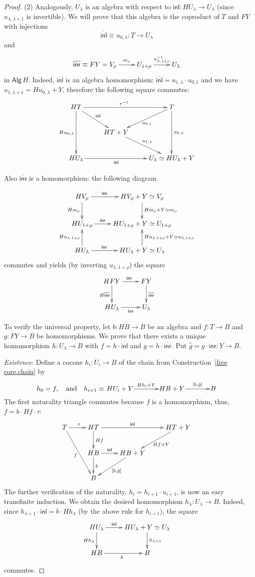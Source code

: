 \documentclass{LMCS}
\theoremstyle{plain}
\theoremstyle{definition}
\numberwithin{equation}{section}
\begin{document}
\begin{proof}
(2) Analogously, $U_\lambda$ is an algebra with respect to $\mathsf{inl}:HU_\lambda \rightarrow U_\lambda$ (since $u_{\lambda,\lambda+1}$ is invertible). We will prove that this algebra is the coproduct of $T$ and $FY$ with injections $$\overline{\mathsf{inl}}\equiv u_{0,\lambda}:T\rightarrow U_\lambda$$ and $$\xymatrix{\overline{\mathsf{inr}}\equiv FY=V_\rho\ar[r]^-{m_\rho}& U_{1+\rho}\ar[r]^-{u_{\lambda,{1+\rho}}^{-1}}& U_\lambda}$$
in $\mathsf{Alg}\, H$. Indeed, $\overline{\mathsf{inl}}$ is an algebra homomorphism: $\overline{\mathsf{inl}}=u_{1,\lambda}\cdot u_{0,1}$ and we have $u_{1,\lambda+1}=Hu_{0,\lambda}+Y$, therefore the following square commutes:
$$
\xymatrix{
HT\ar[rr]^{\tau^{-1}}\ar[rd]^-{\mathsf{inl}}\ar[dd]_{Hu_{0,\lambda}}&&T\ar[ld]^{u_{0,1}}\ar[dd]^{u_{0,\lambda}}\\
&HT+Y\ar[dr]^{u_{1,\lambda}}\\
HU_\lambda\ar[rr]_-{\mathsf{inl}}&&U_\lambda\simeq HU_\lambda+Y
}
$$

Also $\overline{\mathsf{inr}}$ is a homomorphism: the following diagram

$$
\xymatrix{
HV_\rho\ar[r]^-{\mathsf{inr}}\ar[d]_{Hm_\rho}&HV_\rho+Y\simeq V_\rho\ar[d]^{ Hm_\rho+Y\simeq m_\rho}\\
HU_{1+\rho}\ar[r]^-{\mathsf{inr}}&HU_{1+\rho}+Y\simeq U_{1+\rho}\\
HU_\lambda\ar[u]^{Hu_{\lambda,1+\rho}}\ar[r]^-{\mathsf{inr}}&HU_\lambda+Y\simeq U_\lambda\ar[u]_{Hu_{\lambda,1+\rho}+Y\simeq u_{\lambda,1+\rho}}
}
$$
commutes and yields (by inverting $u_{\lambda,1+\rho}$) the square
$$
\xymatrix{
HFY\ar[r]^{\mathsf{inr}}\ar[d]_{H\overline{\mathsf{inr}}}&FY\ar[d]^{\overline{\mathsf{inr}}}\\
HU_\lambda\ar[r]_-{\mathsf{inr}}&U_\lambda
}
$$

To verify the universal property, let $b:HB\rightarrow B$ be an algebra and $f:T\rightarrow B$ and $g:FY\rightarrow B$ be homomorphisms. We prove that there exists a unique homomorphism $h:U_\lambda\rightarrow B$ with $f=h\cdot\overline{\mathsf{inl}}$ and $g=h\cdot\overline{\mathsf{inr}}$. Put $\hat{g}=g\cdot\mathsf{inr}:Y\rightarrow B$.

{\it Existence}: Define a cocone $h_i:U_i\rightarrow B$ of the chain from
Construction~\ref{free core.chain} by
 $$h_0= f,\quad\text{and}\quad h_{i+1}\equiv \xymatrix@1@+1pc{HU_i+Y\ar[r]^-{Hh_i+Y}& HB+Y\ar[r]^-{[b,\hat g]}& B}$$
The first naturality triangle commutes because $f$ is a homomorphism, thus, $f=b\cdot Hf\cdot\tau$:
$$
\xymatrix{
T\ar[r]^{\tau}\ar[rdd]_f&HT\ar[rr]^-{\mathsf{inl}}\ar[d]^{Hf}&&HT+Y\ar[ld]^{Hf+Y}\\
&HB\ar[r]^-{\mathsf{inl}}\ar[d]^{b}&HB+Y\ar[ld]^-{[b,\hat g]}\\
&B
}
$$
The further verification of the naturality, $h_i=h_{i+1}\cdot u_{i+1}$, is now an easy transfinite induction. We obtain the desired homomorphism $h_\lambda:U_\lambda\rightarrow B$.
Indeed, since $h_{\lambda+1}\cdot\mathsf{inl}=b\cdot Hh_\lambda$ (by the above rule for $h_{i+1}$), the square
$$
\xymatrix{
HU_\lambda\ar[r]^-{\mathsf{inl}}\ar[d]_{Hh_\lambda}&HU_\lambda+Y\simeq U_\lambda\ar[d]^{h_{\lambda+1}}\\
HB\ar[r]_h&B
}
$$
commutes.


\end{proof}
\end{document}
